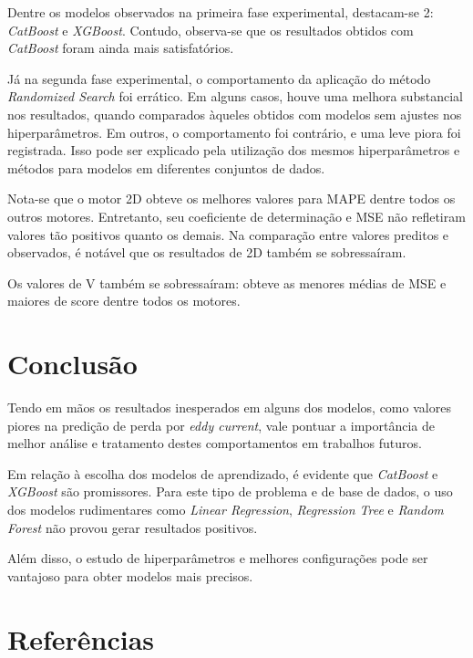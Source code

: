 \documentclass{article}
\begin{document}
Dentre os modelos observados na primeira fase experimental, destacam-se 2: \textit{CatBoost} e \textit{XGBoost}. Contudo, observa-se que os resultados obtidos com \textit{CatBoost} foram ainda mais satisfatórios.

Já na segunda fase experimental, o comportamento da aplicação do método \textit{Randomized Search} foi errático. Em alguns casos, houve uma melhora substancial nos resultados, quando comparados àqueles obtidos com modelos sem ajustes nos hiperparâmetros. Em outros, o comportamento foi contrário, e uma leve piora foi registrada. Isso pode ser explicado pela utilização dos mesmos hiperparâmetros e métodos para modelos em diferentes conjuntos de dados.

Nota-se que o motor 2D obteve os melhores valores para MAPE dentre todos os outros motores. Entretanto, seu coeficiente de determinação e MSE não refletiram valores tão positivos quanto os demais. Na comparação entre valores preditos e observados, é notável que os resultados de 2D também se sobressaíram.

Os valores de V também se sobressaíram: obteve as menores médias de MSE e maiores de score dentre todos os motores.

\section{Conclusão}

Tendo em mãos os resultados inesperados em alguns dos modelos, como valores piores na predição de perda por \textit{eddy current}, vale pontuar a importância de melhor análise e tratamento destes comportamentos em trabalhos futuros.

Em relação à escolha dos modelos de aprendizado, é evidente que \textit{CatBoost} e \textit{XGBoost} são promissores. Para este tipo de problema e de base de dados, o uso dos modelos rudimentares como \textit{Linear Regression}, \textit{Regression Tree} e \textit{Random Forest} não provou gerar resultados positivos.

Além disso, o estudo de hiperparâmetros e melhores configurações pode ser vantajoso para obter modelos mais precisos.

\newpage
\section{Referências}

\printbibliography
\end{document}
